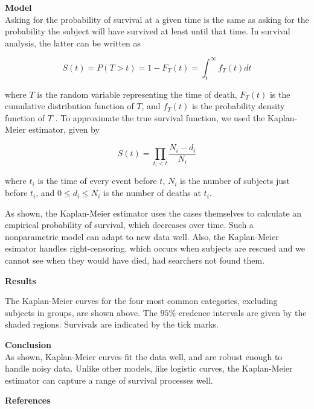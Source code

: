 \documentclass[serif,final]{beamer}
\newcommand{\heading}[1]{{\large \textbf{#1}}\\}
\newcommand{\subheading}[1]{{\textbf{#1}}\\}
\begin{document}
\begin{frame}
\begin{multicols}{3}
      \indent

      \subheading{Model}

      Asking for the probability of survival at a given time is the same as
      asking for the probability the subject will have survived at least
      until that time. In survival analysis, the latter can be written as

      $$S(t) = P(T > t) = 1 - F_T(t) = \int_t^\infty f_T(t) dt$$

      where $T$ is the random variable representing the time of death,
      $F_T(t)$ is the cumulative distribution function of $T$, and $f_T(t)$
      is the probability density function of $T$ \cite{rochford}. To
      approximate the true survival function, we used the Kaplan-Meier
      estimator, given by

      $$S(t) = \prod_{t_i < t} \frac{N_i - d_i}{N_i}$$

      where $t_i$ is the time of every event before $t$, $N_i$ is the number
      of subjects just before $t_i$, and $0 \leq d_i \leq N_i$ is the number of deaths
      at $t_i$.

      \indent

      As shown, the Kaplan-Meier estimator uses the cases themselves to calculate an empirical probability
      of survival, which decreases over time. Such a nonparametric model can adapt to new data well. Also, the
      Kaplan-Meier esimator handles right-censoring, which occurs when subjects are rescued
      and we cannot see when they would have died, had searchers not found them.

      \indent

      \vfill
      \columnbreak

      \heading{Results}

      \begin{center}
      
      \end{center}

      The Kaplan-Meier curves for the four most common categories,
      excluding subjects in groups, are shown above. The $95\%$ credence intervals are
      given by the shaded regions. Survivals
      are indicated by the tick marks.

      \indent

      \heading{Conclusion}
        As shown, Kaplan-Meier curves fit the data well, and are robust enough
        to handle noisy data. Unlike other models, like logistic curves, the Kaplan-Meier
        estimator can capture a range of survival processes well.

      \indent

      \heading{References}
      
      
    \end{multicols}
  \end{frame}
\end{document}
